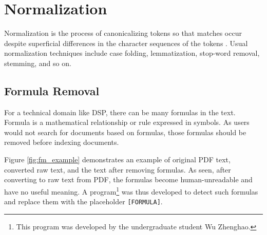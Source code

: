 \section{Normalization}
Normalization is the process of canonicalizing tokens so that matches occur despite superficial differences in the character sequences of the tokens \cite{Manning2008}. Usual normalization techniques include case folding, lemmatization, stop-word removal, stemming, and so on.

\subsection{Formula Removal}
\label{subsec:formula_rm}
For a technical domain like DSP, there can be many formulas in the text. Formula is a mathematical relationship or rule expressed in symbols. As users would not search for documents based on formulas, those formulas should be removed before indexing documents.

Figure \ref{fig:fm_example} demonstrates an example of original PDF text, converted raw text, and the text after removing formulas. As seen, after converting to raw text from PDF, the formulas become human-unreadable and have no useful meaning. A program\footnote{This program was developed by the undergraduate student Wu Zhenghao.} was thus developed to detect such formulas and replace them with the placeholder \texttt{[FORMULA]}.

